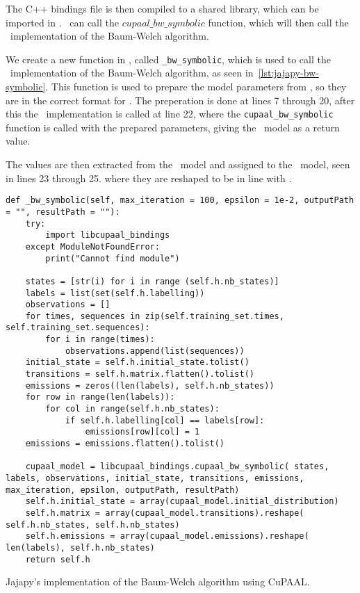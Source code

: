 The C++ bindings file is then compiled to a shared library, which can be imported in \Jajapy.
\Jajapy\ can call the $cupaal\_bw\_symbolic$ function, which will then call the \Cupaal\ implementation of the Baum-Welch algorithm.

We create a new function in \Jajapy, called \texttt{\_bw\_symbolic}, which is used to call the \Cupaal\ implementation of the Baum-Welch algorithm, as seen in~\autoref{lst:jajapy-bw-symbolic}.
This function is used to prepare the model parameters from \Jajapy, so they are in the correct format for \Cupaal.
The preperation is done at lines 7 through 20, after this the \Cupaal\ implementation is called at line 22, where the \texttt{cupaal\_bw\_symbolic} function is called with the prepared parameters, giving the \Cupaal\ model as a return value.

The values are then extracted from the \Cupaal\ model and assigned to the \Jajapy\ model, seen in lines 23 through 25. where they are reshaped to be in line with \Jajapy.

\begin{listing*}[htb!]
    \begin{verbatim}
def _bw_symbolic(self, max_iteration = 100, epsilon = 1e-2, outputPath = "", resultPath = ""):
    try:
        import libcupaal_bindings
    except ModuleNotFoundError:
        print("Cannot find module")

    states = [str(i) for i in range (self.h.nb_states)]
    labels = list(set(self.h.labelling))
    observations = []
    for times, sequences in zip(self.training_set.times, self.training_set.sequences):
        for i in range(times):
            observations.append(list(sequences))
    initial_state = self.h.initial_state.tolist()
    transitions = self.h.matrix.flatten().tolist()
    emissions = zeros((len(labels), self.h.nb_states))
    for row in range(len(labels)):
        for col in range(self.h.nb_states):
            if self.h.labelling[col] == labels[row]:
                emissions[row][col] = 1
    emissions = emissions.flatten().tolist()

    cupaal_model = libcupaal_bindings.cupaal_bw_symbolic( states, labels, observations, initial_state, transitions, emissions, max_iteration, epsilon, outputPath, resultPath)
    self.h.initial_state = array(cupaal_model.initial_distribution)
    self.h.matrix = array(cupaal_model.transitions).reshape( self.h.nb_states, self.h.nb_states)
    self.h.emissions = array(cupaal_model.emissions).reshape( len(labels), self.h.nb_states)
    return self.h
      \end{verbatim}
    \caption{Jajapy's implementation of the Baum-Welch algorithm using CuPAAL.}
    \label{lst:jajapy-bw-symbolic}
\end{listing*}


